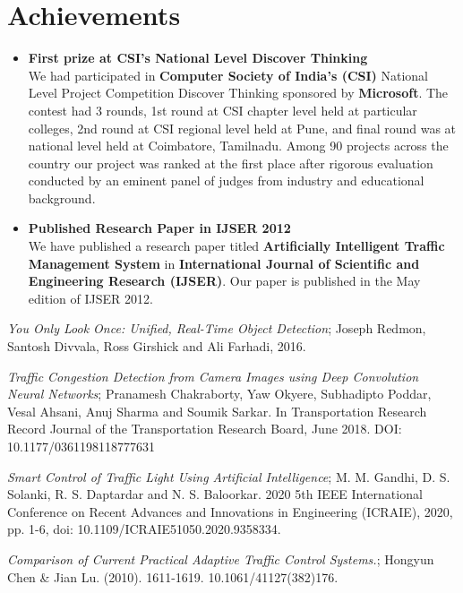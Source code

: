 \documentclass[openany,12pt]{report}
\begin{document}
\chapter{Achievements}
\begin{itemize}
\item{\textbf{First prize at CSI's National Level Discover Thinking}\\
\hspace*{0.5in}We had participated in \textbf{Computer Society of India's (CSI)} National Level Project Competition Discover Thinking sponsored by \textbf{Microsoft}. The contest had 3 rounds, 1st round at CSI chapter level held at particular colleges, 2nd round at CSI regional level held at Pune, and final round was at national level held at Coimbatore, Tamilnadu. Among 90 projects across the country our project was ranked at the first place after rigorous evaluation conducted by an eminent panel of judges from industry and educational background. }
\item{\textbf{Published Research Paper in IJSER 2012}\\
\hspace*{0.5in}We have published a research paper titled \textbf{Artificially Intelligent Traffic Management System} in \textbf{International Journal of Scientific and Engineering Research (IJSER)}. Our paper is published in the May edition of IJSER 2012.}
\end{itemize}
\vspace{5in}
\newpage
{}
\begin{thebibliography}{99}

\emph{You Only Look Once: Unified, Real-Time Object Detection}; Joseph Redmon, Santosh Divvala, Ross Girshick and Ali Farhadi, 2016.

\emph{Traffic Congestion Detection from Camera Images using Deep Convolution Neural Networks}; Pranamesh Chakraborty, Yaw Okyere, Subhadipto Poddar, Vesal Ahsani, Anuj Sharma and Soumik Sarkar. In Transportation Research Record Journal of the Transportation Research Board, June 2018. DOI: 10.1177/0361198118777631

\emph{Smart Control of Traffic Light Using Artificial Intelligence}; M. M. Gandhi, D. S. Solanki, R. S. Daptardar and N. S. Baloorkar. 2020 5th IEEE International Conference on Recent Advances and Innovations in Engineering (ICRAIE), 2020, pp. 1-6, doi: 10.1109/ICRAIE51050.2020.9358334.

\emph{Comparison of Current Practical Adaptive Traffic Control Systems.}; Hongyun Chen \& Jian Lu. (2010). 1611-1619. 10.1061/41127(382)176. 


\end{thebibliography}
\end{document}
